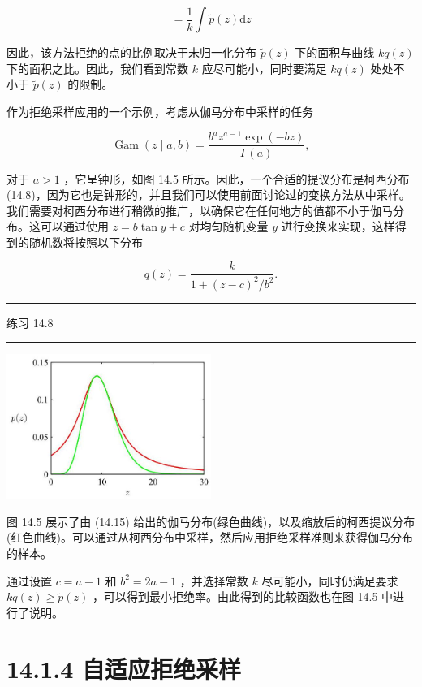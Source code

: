 \documentclass[10pt]{article}
\newcommand{\HRule}{\begin{center}\rule{0.9\linewidth}{0.2mm}\end{center}}
\begin{document}
\[
= \frac{1}{k}\int \widetilde{p}\left( z\right) \mathrm{d}z \tag{14.14}
\]

因此，该方法拒绝的点的比例取决于未归一化分布 \(\widetilde{p}\left( z\right)\) 下的面积与曲线 \({kq}\left( z\right)\) 下的面积之比。因此，我们看到常数 \(k\) 应尽可能小，同时要满足 \({kq}\left( z\right)\) 处处不小于 \(\widetilde{p}\left( z\right)\) 的限制。

作为拒绝采样应用的一个示例，考虑从伽马分布中采样的任务

\[
\operatorname{Gam}\left( {z \mid  a,b}\right)  = \frac{{b}^{a}{z}^{a - 1}\exp \left( {-{bz}}\right) }{\Gamma \left( a\right) }, \tag{14.15}
\]

对于 \(a > 1\) ，它呈钟形，如图 14.5 所示。因此，一个合适的提议分布是柯西分布 (14.8)，因为它也是钟形的，并且我们可以使用前面讨论过的变换方法从中采样。我们需要对柯西分布进行稍微的推广，以确保它在任何地方的值都不小于伽马分布。这可以通过使用 \(z = b\tan y + c\) 对均匀随机变量 \(y\) 进行变换来实现，这样得到的随机数将按照以下分布

\[
q\left( z\right)  = \frac{k}{1 + {\left( z - c\right) }^{2}/{b}^{2}}. \tag{14.16}
\]

\HRule

练习 14.8

\HRule

\begin{center}
\includegraphics[max width=0.5\textwidth]{images/0194e279-9b28-703a-88f4-c3ac21e2010d_454_902_358_635_448_0.jpg}
\end{center}
\hspace*{3em} 

图 14.5 展示了由 (14.15) 给出的伽马分布(绿色曲线)，以及缩放后的柯西提议分布(红色曲线)。可以通过从柯西分布中采样，然后应用拒绝采样准则来获得伽马分布的样本。

通过设置 \(c = a - 1\) 和 \({b}^{2} = {2a} - 1\) ，并选择常数 \(k\) 尽可能小，同时仍满足要求 \({kq}\left( z\right)  \geq  \widetilde{p}\left( z\right)\) ，可以得到最小拒绝率。由此得到的比较函数也在图 14.5 中进行了说明。

\section*{14.1.4 自适应拒绝采样}
\end{document}
